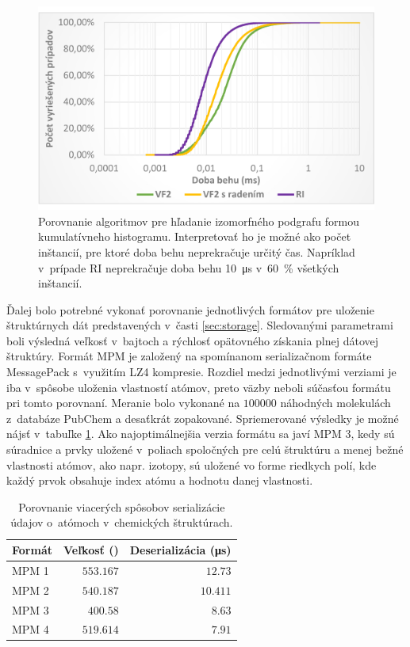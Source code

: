\documentclass[slovak]{ExcelAtFIT} %
\begin{document}
\begin{figure}[!htb]
	\centering
	\includegraphics[width=1\linewidth]{images/algo_graph.pdf}
	\caption{Porovnanie algoritmov pre hľadanie i\-zo\-morf\-né\-ho podgrafu formou kumulatívneho hi\-sto\-gra\-mu. Interpretovať ho je možné ako počet inštancií, pre ktoré doba behu neprekračuje určitý čas. Napríklad v~prípade RI neprekračuje doba behu \SI{10}{\micro \second} v~\SI{60}{\percent} všetkých inštancií. }
	\label{fig:algo_graph}
\end{figure}

Ďalej bolo potrebné vykonať porovnanie jednotlivých formátov pre uloženie štruktúrnych dát predstavených v~časti \ref{sec:storage}. Sledovanými parametrami boli výsledná veľkosť v~bajtoch a rýchlosť opätovného získania plnej dátovej štruktúry. Formát MPM je za\-lo\-že\-ný na spomínanom serializačnom formáte MessagePack s~využitím LZ4 kompresie. Rozdiel medzi jednotlivými verziami je iba v~spôsobe uloženia vlastností atómov, preto väzby neboli súčasťou formátu pri tomto porovnaní. Meranie bolo vykonané na $100000$ náhodných molekulách z~databáze PubChem a desaťkrát zopakované. Spriemerované vý\-sledky je možné nájsť v~tabuľke \ref{tab:mpms}. Ako najoptimálnejšia verzia formátu sa javí MPM 3, kedy sú súradnice a prvky uložené v~poliach spoločných pre celú štruktúru a menej bežné vlastnosti atómov, ako napr. izotopy, sú uložené vo forme riedkych polí, kde každý prvok obsahuje index atómu a hodnotu danej vlastnosti.

\begin{table}[h]
	\vskip6pt
	\caption{Porovnanie viacerých spôsobov serializácie údajov o~atómoch v~chemických štruktúrach.}
	\centering
	\begin{tabular}{l|r|r}
		\toprule
		Formát & Veľkosť (\si{\byte}) & Deserializácia (\si{\micro\second}) \\
		\midrule
		MPM 1 & $553.167$ & $12.73$ \\
		MPM 2 & $540.187$ & $10.411$ \\
		MPM 3 & $400.58$ & $8.63$ \\
		MPM 4 & $519.614$ & $7.91$ \\
		\bottomrule
	\end{tabular}
	\label{tab:mpms}
\end{table}
\end{document}
